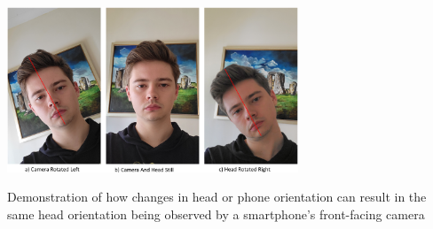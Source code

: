 

\begin{teaserfigure}
  \center
  \includegraphics[width=0.65\textwidth]{figures/HeadOrientations.png}
  \caption{Demonstration of how changes in head or phone orientation can result in the same head orientation being observed by a smartphone's front-facing camera}
  \label{fig:teaser}
\end{teaserfigure}

\maketitle





